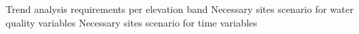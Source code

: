 \begin{frame}{Trend analysis requirements per elevation band}
			\centering
			Necessary sites scenario for water quality variables
			\only<1>{}	
			\only<2>{}
			\only<3>{}
			\only<4>{}
			Necessary sites scenario for time variables
			\only<1>{}
			\only<2>{}
			\only<3>{}
			\only<4>{}
		\end{frame}